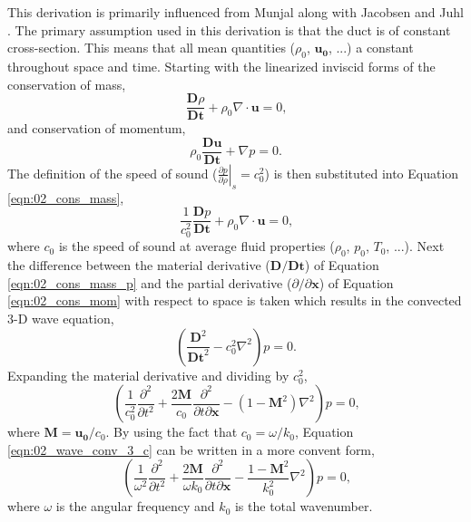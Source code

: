 This derivation is primarily influenced from Munjal \cite{Munjal-2014-w28y4EyP} along with Jacobsen and Juhl \cite{Jacobsen-2013-PHD3v3YZ}.
The primary assumption used in this derivation is that the duct is of constant cross-section.
This means that all mean quantities ($\rho_0$, $\mathbf{u_0}$, ...) a constant throughout space and time.
Starting with the linearized inviscid forms of the conservation of mass,
\begin{equation}
  \frac{\mathbf{D}\rho}{\mathbf{Dt}} + \rho_0\nabla\cdot\mathbf{u} = 0 \textrm{,}
  \label{eqn:02_cons_mass}
\end{equation}
and conservation of momentum,
\begin{equation}
  \rho_0\frac{\mathbf{Du}}{\mathbf{Dt}} + \nabla p = 0 \textrm{.}
  \label{eqn:02_cons_mom}
\end{equation}
The definition of the speed of sound ($\left.\frac{\partial p}{\partial\rho}\right|_s = c_0^2$) is then substituted into Equation \ref{eqn:02_cons_mass},
\begin{equation}
  \frac{1}{c_0^2}\frac{\mathbf{D}p}{\mathbf{Dt}} + \rho_0\nabla\cdot\mathbf{u} = 0 \textrm{,}
  \label{eqn:02_cons_mass_p}
\end{equation}
where $c_0$ is the speed of sound at average fluid properties ($\rho_0$, $p_0$, $T_0$, ...).
Next the difference between the material derivative ($\mathbf{D}/\mathbf{Dt}$) of Equation \ref{eqn:02_cons_mass_p} and the partial derivative ($\partial/\partial\mathbf{x}$) of Equation \ref{eqn:02_cons_mom} with respect to space is taken which results in the convected 3-D wave equation,
\begin{equation}
  \left(\frac{\mathbf{D}^2}{\mathbf{Dt}^2}-c_0^2\nabla^2\right)p=0\textrm{.}
  \label{eqn:02_wave_conv_3_c}
\end{equation}
Expanding the material derivative and dividing by $c_0^2$,
\begin{equation}
  \left(\frac{1}{c_0^2}\frac{\partial^2}{\partial t^2} + \frac{2\mathbf{M}}{c_0}\frac{\partial^2}{\partial t\partial\mathbf{x}} - (1-\mathbf{M}^2)\nabla^2\right)p = 0 \textrm{,}
  \label{eqn:02_wave_conv_expand}
\end{equation}
where $\mathbf{M} = \mathbf{u_0}/c_0$.
By using the fact that $c_0=\omega/k_0$, Equation \ref{eqn:02_wave_conv_3_c} can be written in a more convent form,
\begin{equation}
  \left(\frac{1}{\omega^2}\frac{\partial^2}{\partial t^2} + \frac{2\mathbf{M}}{\omega k_0}\frac{\partial^2}{\partial t\partial\mathbf{x}} - \frac{1-\mathbf{M}^2}{k_0^2}\nabla^2\right)p = 0 \textrm{,}
  \label{eqn:02_wave_conv_3}
\end{equation}
where $\omega$ is the angular frequency and $k_0$ is the total wavenumber.

